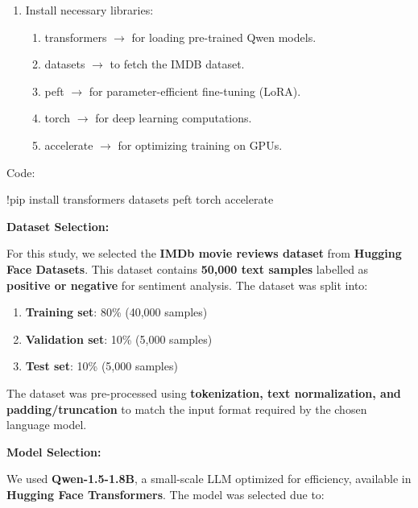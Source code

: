 \documentclass{article} %
\begin{document}
\begin{enumerate}
\item  Install necessary libraries:

\begin{enumerate}
\item  transformers $\mathrm{\to}$ for loading pre-trained Qwen models.

\item  datasets $\mathrm{\to}$ to fetch the IMDB dataset.

\item  peft $\mathrm{\to}$ for parameter-efficient fine-tuning (LoRA).

\item  torch $\mathrm{\to}$ for deep learning computations.

\item  accelerate $\mathrm{\to}$ for optimizing training on GPUs.
\end{enumerate}
\end{enumerate}

\noindent \begin{flushleft}
Code:

\noindent !pip install transformers datasets peft torch accelerate
\newline

\noindent \textbf{}
\newline

\noindent \textbf{Dataset Selection:}

\noindent For this study, we selected the \textbf{IMDb movie reviews dataset} from \textbf{Hugging Face Datasets}. This dataset contains \textbf{50,000 text samples} labelled as \textbf{positive or negative} for sentiment analysis. The dataset was split into:
\end{flushleft}

\begin{enumerate}
\item  \textbf{Training set}: 80\% (40,000 samples)

\item  \textbf{Validation set}: 10\% (5,000 samples)

\item  \textbf{Test set}: 10\% (5,000 samples)
\end{enumerate}

\noindent \begin{flushleft}
The dataset was pre-processed using \textbf{tokenization, text normalization, and padding/truncation} to match the input format required by the chosen language model.

\noindent 
\newline

\noindent \textbf{Model Selection:}

\noindent We used \textbf{Qwen-1.5-1.8B}, a small-scale LLM optimized for efficiency, available in \textbf{Hugging Face Transformers}. The model was selected due to:
\end{flushleft}
\end{document}
